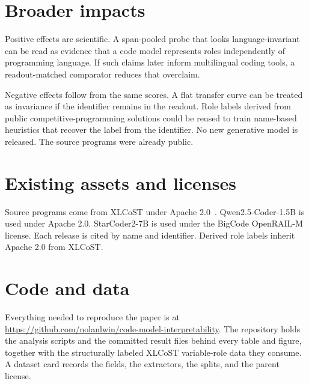 \documentclass{article}
\begin{document}
\section{Broader impacts}
\label{app:impacts}
Positive effects are scientific. A span-pooled probe that looks
language-invariant can be read as evidence that a code model represents roles
independently of programming language. If such claims later inform multilingual
coding tools, a readout-matched comparator reduces that overclaim.

Negative effects follow from the same scores. A flat transfer curve can be
treated as invariance if the identifier remains in the readout. Role labels
derived from public competitive-programming solutions could be reused to train
name-based heuristics that recover the label from the identifier. No new
generative model is released. The source programs were already public.

\section{Existing assets and licenses}
\label{app:licenses}
Source programs come from XLCoST under Apache 2.0~\citep{zhu2022xlcost}.
Qwen2.5-Coder-1.5B is used under Apache 2.0. StarCoder2-7B is used under the
BigCode OpenRAIL-M license. Each release is cited by name and identifier.
Derived role labels inherit Apache 2.0 from XLCoST.

\section{Code and data}
\label{app:assets}
Everything needed to reproduce the paper is at
\url{https://github.com/nolanlwin/code-model-interpretability}. The repository
holds the analysis scripts and the committed result files behind every table
and figure, together with the structurally labeled XLCoST variable-role data
they consume. A dataset card records the fields, the extractors, the splits,
and the parent license.

\end{document}
